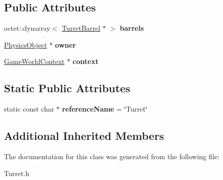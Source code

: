 \subsection*{Public Attributes}
\begin{DoxyCompactItemize}
\item 
\hypertarget{class_arena_1_1_turret_ae35db2338010af2d23eb1a4a4a3ac330}{octet\+::dynarray$<$ \hyperlink{class_arena_1_1_turret_barrel}{Turret\+Barrel} $\ast$ $>$ {\bfseries barrels}}\label{class_arena_1_1_turret_ae35db2338010af2d23eb1a4a4a3ac330}

\item 
\hypertarget{class_arena_1_1_turret_abc48f07b0a60876d01da42fdf8a9965a}{\hyperlink{class_arena_1_1_physics_object}{Physics\+Object} $\ast$ {\bfseries owner}}\label{class_arena_1_1_turret_abc48f07b0a60876d01da42fdf8a9965a}

\item 
\hypertarget{class_arena_1_1_turret_a13d4843f21f803ba019839d2c8db5fe6}{\hyperlink{struct_arena_1_1_game_world_context}{Game\+World\+Context} $\ast$ {\bfseries context}}\label{class_arena_1_1_turret_a13d4843f21f803ba019839d2c8db5fe6}

\end{DoxyCompactItemize}
\subsection*{Static Public Attributes}
\begin{DoxyCompactItemize}
\item 
\hypertarget{class_arena_1_1_turret_ad599779d1e7603ff7d837be8444d1f3d}{static const char $\ast$ {\bfseries reference\+Name} = \char`\"{}Turret\char`\"{}}\label{class_arena_1_1_turret_ad599779d1e7603ff7d837be8444d1f3d}

\end{DoxyCompactItemize}
\subsection*{Additional Inherited Members}


The documentation for this class was generated from the following file\+:\begin{DoxyCompactItemize}
\item 
Turret.\+h\end{DoxyCompactItemize}
